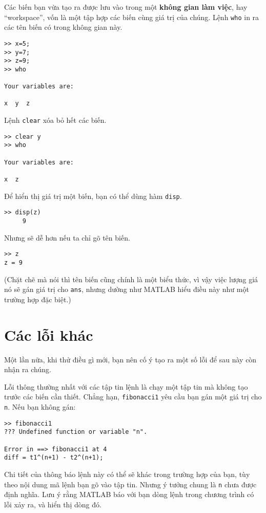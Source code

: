 \documentclass[12pt]{book}
\begin{document}
Các biến bạn vừa tạo ra được lưu vào trong một {\bf không gian làm việc},
hay ``workspace'', vốn là một tập hợp các biến cùng giá trị của chúng.
Lệnh {\tt who} in ra các tên biến có trong không gian này.

\begin{verbatim}
>> x=5;
>> y=7;
>> z=9;
>> who

Your variables are:

x  y  z  
\end{verbatim}
%
Lệnh {\tt clear} xóa bỏ hết các biến.

\begin{verbatim}
>> clear y
>> who

Your variables are:

x  z  
\end{verbatim}
%
Để hiển thị giá trị một biến, bạn có thể dùng hàm {\tt disp}.

\begin{verbatim}
>> disp(z)
     9
\end{verbatim}
%
Nhưng sẽ dễ hơn nếu ta chỉ gõ tên biến.

\begin{verbatim}
>> z
z = 9
\end{verbatim}
%
(Chặt chẽ mà nói thì tên biến cũng chính là một biểu thức, vì vậy
việc lượng giá nó sẽ gán giá trị cho {\tt ans}, nhưng dường như 
MATLAB hiểu điều này như một trường hợp đặc biệt.)


\section{Các lỗi khác}

Một lần nữa, khi thử điều gì mới, bạn nên cố ý tạo ra một số lỗi để
sau này còn nhận ra chúng.

Lỗi thông thường nhất với các tập tin lệnh là chạy một tập tin mà
không tạo trước các biến cần thiết. Chẳng hạn, {\tt fibonacci1} yêu cầu
bạn gán một giá trị cho {\tt n}. Nếu bạn không gán:

\begin{verbatim}
>> fibonacci1
??? Undefined function or variable "n".

Error in ==> fibonacci1 at 4
diff = t1^(n+1) - t2^(n+1);
\end{verbatim}
Chi tiết của thông báo lệnh này có thể sẽ khác trong trường hợp của
bạn, tùy theo nội dung mã lệnh bạn gõ vào tập tin. Nhưng ý tưởng chung
là {\tt n} chưa được định nghĩa. Lưu ý rằng MATLAB báo với bạn dòng
lệnh trong chương trình có lỗi xảy ra, và hiển thị dòng đó.
\end{document}
